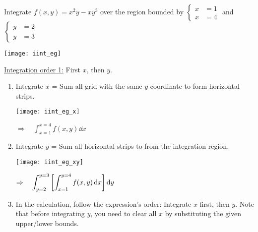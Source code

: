 \documentclass[class=article, crop=false, 12pt]{standalone}
\begin{document}
\begin{example}
    Integrate $f(x,y) = x^2y-xy^3$ over the region bounded by 
    $\begin{cases}x&=1\\x&=4\end{cases}$ and $\begin{cases}y&=2\\y&=3\end{cases}$

    \begin{center}
        \texttt{[image: iint\_eg]}
    \end{center}

    \ul{Integration order 1:} First $x$, then $y$.
    \begin{enumerate}
        \item Integrate $x$ = Sum all grid with the same $y$ coordinate to form horizontal strips.
        
        \begin{center}
            \begin{minipage}{0.55\textwidth}
                \centering
                \texttt{[image: iint\_eg\_x]}
            \end{minipage}
            $\displaystyle \Rightarrow \quad  \int_{x=1}^{x=4}f(x,y)\dd{x}$
        \end{center}

        
        \item Integrate $y$ = Sum all horizontal strips to from the integration region.
        
        \begin{center}
            \begin{minipage}{0.55\textwidth}
                \centering
                \texttt{[image: iint\_eg\_xy]}
            \end{minipage}
            $\displaystyle \Rightarrow \quad  \int_{y=2}^{y=3}\qty[\int_{x=1}^{y=4}f(x,y)\dd{x}]\dd{y}$
        \end{center}

        \item In the calculation, follow the expression's order: Integrate $x$ first, then $y$. 
        Note that before integrating $y$, you need to clear all $x$ by substituting the given upper/lower bounds.
    \end{enumerate}


\end{example}
\end{document}
